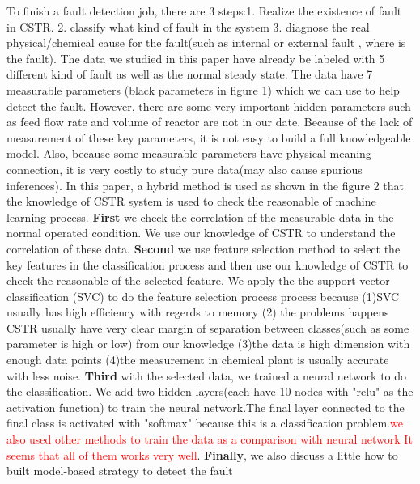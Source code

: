 \documentclass[fleqn,11pt]{wlscirep}
\newcommand{\ydnote}[1]{\textcolor{red}{#1}}
\begin{document}
To finish a fault detection job, there are 3 steps:1. Realize the existence of fault in CSTR. 2. classify what kind of fault in the system 3. diagnose the real physical/chemical cause for the fault(such as internal or external fault , where is the fault). The data we studied in this paper have already be labeled with 5 different kind of fault as well as the normal steady state. The data have 7 measurable parameters (black parameters in figure 1) which we can use to help detect the fault. However, there are some very important hidden parameters such as feed flow rate and volume of reactor  are not in our date. Because of the lack of measurement of these key parameters, it is not easy to build a full knowledgeable model. Also, because some measurable parameters have physical meaning connection, it is very costly to study pure data(may also cause spurious inferences). In this paper, a hybrid method is used as shown in the figure 2 that the knowledge of CSTR  system is used to check the reasonable of machine learning process. \textbf{First} we check the correlation of the measurable data in the normal operated condition. We use our knowledge of CSTR to understand the correlation of these data. \textbf{Second}  we use feature selection method to select the key features in the classification process and then use our knowledge of CSTR to check the reasonable of the selected feature. We apply the the support vector classification (SVC) to do the feature selection process process because (1)SVC usually has high efficiency with regerds to memory (2) the problems happens CSTR usually have very clear margin of separation between classes(such as some parameter is high or low) from our knowledge (3)the data is high dimension with enough data points (4)the measurement in chemical plant is usually accurate with less noise. \textbf{Third} with the selected data, we trained a neural network to do the classification. We add two hidden layers(each have 10 nodes with "relu" as the activation function) to train the neural network.The final layer connected to the final class is activated with "softmax" because this is a classification problem.\ydnote{we also used other methods to train the data as  a comparison with neural network It seems that all of them works very well}.
\textbf{Finally}, we also discuss a little how to built model-based strategy to detect the fault
\end{document}
